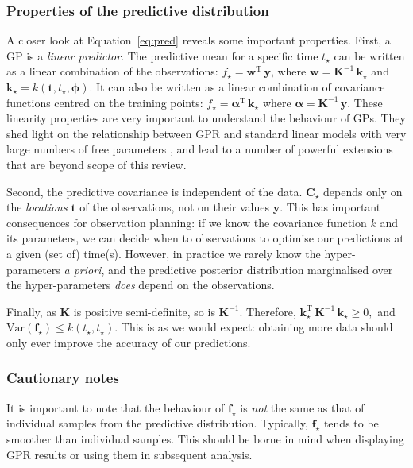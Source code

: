 \documentclass[letterpaper]{ar-1col}
\newcommand{\hyperparams}{\ensuremath{\boldsymbol{\phi}}}
\begin{document}
\subsubsection{Properties of the  predictive distribution}
A closer look at Equation~\ref{eq:pred} reveals some important properties.
First, a GP is a \textit{linear predictor}. The predictive mean for a specific time $t_\star$ can be written as a linear combination of the observations:
$f_\star = \mathbf{w}^{\mathrm{T}} \, \mathbf{y}$, where $\mathbf{w} = \mathbf{K}^{-1} \, \mathbf{k}_\star$ and $\mathbf{k}_\star=k(\mathbf{t},t_\star,\hyperparams)$. It can also be written as
a linear combination of covariance functions centred on the training points:
$f_\star = \mathbf{\alpha}^\mathrm{T} \,  \mathbf{k}_\star$ where $\mathbf{\alpha} = \mathbf{K}^{-1} \, \mathbf{y}$.
These linearity properties are very important to understand the behaviour of GPs. They shed light on the relationship between GPR and standard linear models with very large numbers of free parameters \citep[see e.g.][for a more detailed discussion]{2021PASP..133i3001H},
and lead to a number of powerful extensions that are beyond  scope of this review.

Second, the predictive covariance is independent of the data. $\mathbf{C}_\star$ depends only on the \emph{locations} $\mathbf{t}$ of the observations, not on their values $\mathbf{y}$. This has important consequences for observation planning: if we know the covariance function $k$ and its parameters, we can decide when to observations to optimise our predictions at a given (set of) time(s). However, in practice we rarely know the hyper-parameters \textit{a priori}, and the predictive posterior distribution marginalised over the hyper-parameters \textit{does} depend on the observations.

Finally, as $\mathbf{K}$ is positive semi-definite, so is $\mathbf{K}^{-1}$. Therefore, $\mathbf{k}_\star^{\mathrm{T}} \, \mathbf{K}^{-1} \, \mathbf{k}_\star \ge 0,$ and $\mathrm{Var}(\mathbf{f}_\star) \leq k(t_\star,t_\star)$. This is as we would expect: obtaining more data should only ever improve the accuracy of our predictions.

\subsubsection{Cautionary notes}
\label{sec:caution}
It is important to note that the behaviour of $\mathbf{f}_\star$ is \emph{not} the same as that of individual samples from the predictive distribution. Typically,  $\mathbf{f}_\star$ tends to be smoother than individual samples. This should be borne in mind when displaying GPR results or using them in subsequent analysis.
\end{document}

